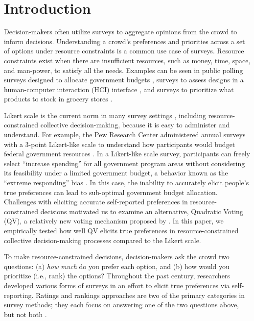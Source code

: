 \section{Introduction}
Decision-makers often utilize surveys to aggregate opinions from the crowd to inform decisions. Understanding a crowd's preferences and priorities across a set of options under resource constraints is a common use case of surveys. Resource constraints exist when there are insufficient resources, such as money, time, space, and man-power, to satisfy all the needs. Examples can be seen in public polling surveys designed to allocate government budgets \cite{pew_spending}, surveys to assess designs in a human-computer interaction (HCI) interface \cite{ledo2018evaluation}, and surveys to prioritize what products to stock in grocery stores \cite{nielsen}. 

Likert scale is the current norm in many survey settings \cite{moors2016two}, including resource-constrained collective decision-making, because it is easy to administer and understand. For example, the Pew Research Center administered annual surveys with a 3-point Likert-like scale to understand how participants would budget federal government resources \cite{pew_spending}. In a Likert-like scale survey, participants can freely select ``increase spending'' for all government program areas without considering its feasibility under a limited government budget, a behavior known as the ``extreme responding'' bias \cite{batchelor2016extreme, furnham1986response, meisenberg2008acquiescent}. In this case, the inability to accurately elicit people's true preferences can lead to sub-optimal government budget allocation. Challenges with eliciting accurate self-reported preferences in resource-constrained decisions motivated us to examine an alternative, Quadratic Voting (QV), a relatively new voting mechanism proposed by \textcite{posner2018radical}. In this paper, we empirically tested how well QV elicits true preferences in resource-constrained collective decision-making processes compared to the Likert scale.

To make resource-constrained decisions, decision-makers ask the crowd two questions: (a) \textit{how much} do you prefer each option, and (b) how would you prioritize (i.e., rank) the options? Throughout the past century, researchers developed various forms of surveys in an effort to elicit true preferences via self-reporting. Ratings and rankings approaches are two of the primary categories in survey methods; they each focus on answering one of the two questions above, but not both \cite{moors2016two}. 

